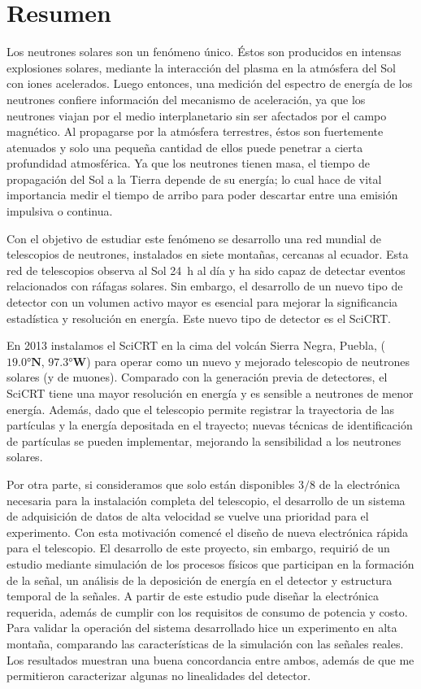 \pagestyle{empty}
\chapter{Resumen}

Los neutrones solares son un fenómeno único. Éstos son producidos en intensas explosiones solares, mediante la interacción del plasma en la atmósfera del Sol con iones acelerados. Luego entonces, una medición del espectro de energía de los neutrones confiere información del mecanismo de aceleración, ya que  los neutrones viajan por el medio interplanetario sin ser afectados por el campo magnético. Al propagarse por la atmósfera terrestres, éstos son fuertemente atenuados y solo una pequeña cantidad de ellos puede penetrar a cierta profundidad atmosférica. Ya que los neutrones tienen masa, el tiempo de propagación del Sol a la Tierra depende de su energía; lo cual hace de vital importancia medir el tiempo de arribo para poder descartar entre una emisión impulsiva o continua.

Con el objetivo de estudiar este fenómeno se desarrollo una red mundial de telescopios de neutrones, instalados en siete montañas, cercanas al ecuador. Esta red de telescopios observa al Sol \SI{24}{\hour} al día y ha sido capaz de detectar eventos relacionados con ráfagas solares. Sin embargo, el desarrollo de un nuevo tipo de detector con un volumen activo mayor es esencial para mejorar la significancia estadística y resolución en energía. Este nuevo tipo de detector es el SciCRT.

En \num{2013} instalamos el SciCRT en la cima del volcán Sierra Negra, Puebla, ($\ang{19.0}\mathbf{N}$, $\ang{97.3}\mathbf{W}$) para operar como un nuevo y mejorado telescopio de neutrones solares (y de muones). Comparado con la generación previa de detectores, el SciCRT tiene una mayor resolución en energía y es sensible a neutrones de menor energía. Además, dado que el telescopio permite registrar la trayectoria de las partículas y la energía depositada en el trayecto; nuevas técnicas de identificación de partículas se pueden implementar, mejorando la sensibilidad a los neutrones solares.

Por otra parte, si consideramos que solo están disponibles $3/8$ de la electrónica necesaria para la instalación completa del telescopio, el desarrollo de un sistema de adquisición de datos de alta velocidad se vuelve una prioridad para el experimento. Con esta motivación comencé el diseño de nueva electrónica rápida para el telescopio. El desarrollo de este proyecto, sin embargo, requirió de un estudio mediante simulación de los procesos físicos que participan en la formación de la señal, un análisis de la deposición de energía en el detector y estructura temporal de la señales. A partir de este estudio pude diseñar la electrónica requerida, además de cumplir con los requisitos de consumo de potencia y costo. Para validar la operación del sistema desarrollado hice un experimento en alta montaña, comparando las características de la simulación con las señales reales. Los resultados muestran una buena concordancia entre ambos, además de que me permitieron caracterizar algunas no linealidades del detector.

